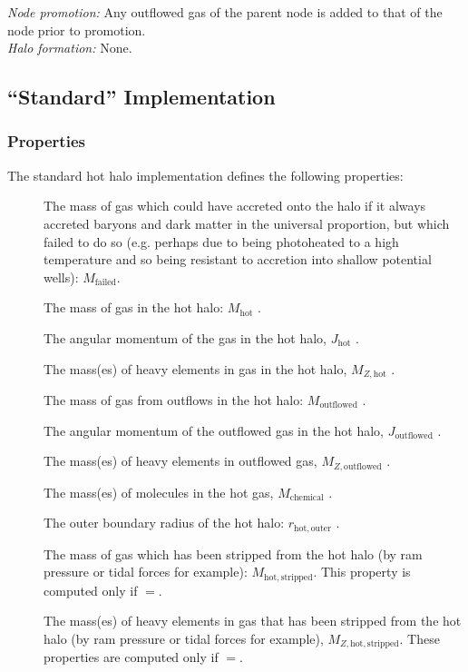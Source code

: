 \noindent\emph{Node promotion:} Any outflowed gas of the parent \gls{node} is added to that of the \gls{node} prior to promotion.\\

\noindent\emph{Halo formation:} None.\\

\subsection{``Standard'' Implementation}

\subsubsection{Properties}

The standard hot halo implementation defines the following properties:
\begin{description}
 \item [] The mass of gas which could have accreted onto the halo if it always accreted baryons and dark matter in the universal proportion, but which failed to do so (e.g. perhaps due to being photoheated to a high temperature and so being resistant to accretion into shallow potential wells): $M_\mathrm{failed}$.
 \item [] The mass of gas in the hot halo: $M_\mathrm{hot}$ \mono{[hotHaloMass]}.
 \item [] The angular momentum of the gas in the hot halo, $J_\mathrm{hot}$ \mono{[hotHaloAngularMomentum]}.
 \item [] The mass(es) of heavy elements in gas in the hot halo, $M_{Z, \mathrm{hot}}$ .
 \item [] The mass of gas from outflows in the hot halo: $M_\mathrm{outflowed}$ \mono{[hotHaloOutflowedMass]}.
 \item [] The angular momentum of the outflowed gas in the hot halo, $J_\mathrm{outflowed}$ \mono{[hotHaloOutflowedAngularMomentum]}.
 \item [] The mass(es) of heavy elements in outflowed gas, $M_{Z, \mathrm{outflowed}}$ .
 \item [] The mass(es) of molecules in the hot gas, $M_\mathrm{chemical}$ .
 \item [] The outer boundary radius of the hot halo: $r_\mathrm{hot, outer}$ \mono{[hotHaloOuterRadius]}.
 \item [] The mass of gas which has been stripped from the hot halo (by ram pressure or tidal forces for example): $M_\mathrm{hot, stripped}$. This property is computed only if \mono{[hotHaloTrackStrippedGas]}$=$.
 \item [] The mass(es) of heavy elements in gas that has been stripped from the hot halo (by ram pressure or tidal forces for example), $M_{Z, \mathrm{hot, stripped}}$. These properties are computed only if \mono{[hotHaloTrackStrippedGas]}$=$.
\end{description}
